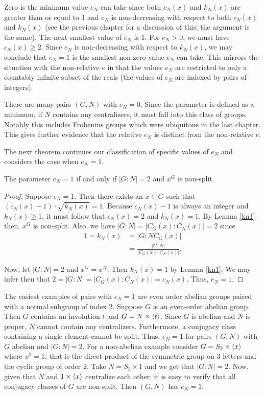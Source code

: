 \documentclass[main.tex]{subfiles}
\begin{document}
Zero is the minimum value $e_N$ can take since both $c_N(x)$ and $k_N(x)$ are greater than or equal to 1 and $e_N$ is non-decreasing with respect to both $c_N(x)$ and $k_N(x)$ (see the previous chapter for a discussion of this; the argument is the same). The next smallest value of $e_N$ is 1. For $e_N > 0$, we must have $c_N(x) \ge 2$. Since $e_N$ is non-decreasing with respect to $k_N(x)$, we may conclude that $e_N = 1$ is the smallest non-zero value $e_N$ can take. This mirrors the situation with the non-relative $e$ in that the values $e_N$ are restricted to only a countably infinite subset of the reals (the values of $e_N$ are indexed by pairs of integers).

There are many pairs $(G, N)$ with $e_N = 0$. Since the parameter is defined as a minimum, if $N$ contains any centralizers, it must fall into this class of groups. Notably this includes Frobenius groups which were ubiquitous in the last chapter. This gives further evidence that the relative $e_N$ is distinct from the non-relative $e$.

The next theorem continues our classification of specific values of $e_N$ and considers the case when $e_N = 1$.

\begin{theorem}\label{en1}
The parameter $e_N = 1$ if and only if $|G:N| = 2$ and $x^G$ is non-split.
\end{theorem}

\begin{proof}
Suppose $e_N = 1$. Then there exists an $x \in G$ such that $(c_N(x) - 1) \cdot \sqrt{k_N(x)} = 1$. Because $c_N(x) - 1$ is always an integer and $k_N(x) \ge 1$, it must follow that $c_N(x) = 2$ and $k_N(x) = 1$. By Lemma \ref{kn1} then, $x^G$ is non-split. Also, we have $|G : N| = |C_G(x) : C_N(x)| = 2$ since
\begin{align*}
1 = k_N(x) &= |G : NC_G(x)| \\
&= \frac{|G : N|}{|C_G(x) : C_N(x)|} \text{.}
\end{align*}

Now, let $|G:N| = 2$ and $x^G = x^N$. Then $k_N(x) = 1$ by Lemma \ref{kn1}. We may infer then that $2 = |G : N| = |C_G(x) : C_N(x)| = c_N(x)$. Thus, $e_N = 1$. 
\end{proof}

The easiest examples of pairs with $e_N = 1$ are even order abelian groups paired with a normal subgroup of index 2. Suppose $G$ is an even-order abelian group. Then $G$ contains an involution $t$ and $G = N \times \langle t \rangle$. Since $G$ is abelian and $N$ is proper, $N$ cannot contain any centralizers. Furthermore, a conjugacy class containing a single element cannot be split. Thus, $e_N = 1$ for pairs $(G, N)$ with $G$ abelian and $|G : N| = 2$. For a non-abelian example consider $G = S_3 \times \langle x \rangle$ where $x^2 = 1$, that is the direct product of the symmetric group on 3 letters and the cyclic group of order 2. Take $N = S_3 \times 1$ and we get that $|G:N| = 2$. Now, given that $N$ and $1 \times \langle x \rangle$ centralize each other, it is easy to verify that all conjugacy classes of $G$ are non-split. Then $(G, N)$ has $e_N = 1$.
\end{document}
